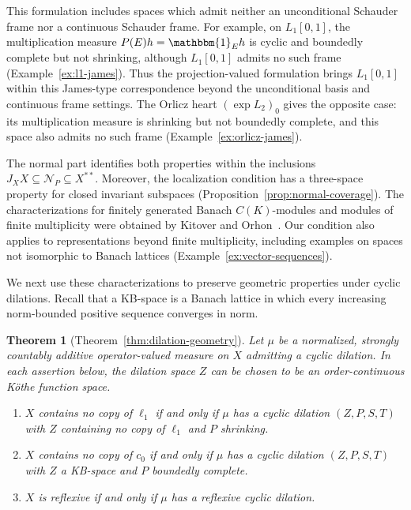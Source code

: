 \documentclass[11pt,leqno]{amsart}
\theoremstyle{compact}
\newtheorem{maintheorem}{Theorem}
\numberwithin{equation}{section}
\theoremstyle{compactremark}
\theoremstyle{compact}
\newcommand{\1}{\mathbbm{1}}
\newcommand{\mnote}[2][0pt]{%
    \marginnote{%
        \parbox[t]{1.8cm}{%
            \raggedright\tiny #2%
        }%
    }[#1]%
}
\begin{document}
This formulation includes spaces which admit neither an unconditional Schauder frame nor a continuous Schauder frame. For example, on $L_1[0,1]$, the multiplication measure $P(E)h=\1_Eh$ is cyclic and boundedly complete but not shrinking, although $L_1[0,1]$ admits no such frame (Example~\ref{ex:l1-james}). Thus the projection-valued formulation brings $L_1[0,1]$ within this James-type correspondence beyond the unconditional basis and continuous frame settings. The Orlicz heart $(\exp L_2)_0$ gives the opposite case: its multiplication measure is shrinking but not boundedly complete, and this space also admits no such frame (Example~\ref{ex:orlicz-james}).

The normal part identifies both properties within the inclusions $J_XX\subseteq\mathcal N_P\subseteq X^{**}$. Moreover, the localization condition has a three-space property for closed invariant subspaces (Proposition~\ref{prop:normal-coverage}). The characterizations for finitely generated Banach $C(K)$-modules and modules of finite multiplicity were obtained by Kitover and Orhon~\cite{KitoverOrhon2014,KitoverOrhon2017}. Our condition also applies to representations beyond finite multiplicity, including examples on spaces not isomorphic to Banach lattices (Example~\ref{ex:vector-sequences}).


We next use these characterizations to preserve geometric properties under cyclic dilations. Recall that a KB-space is a Banach lattice in which every increasing norm-bounded positive sequence converges in norm.

\begin{maintheorem}[Theorem~\ref{thm:dilation-geometry}]\label{intro:dilation}
Let $\mu$ be a normalized, strongly countably additive operator-valued measure on $X$ admitting a cyclic dilation. In each assertion below, the dilation space $Z$ can be chosen to be an order-continuous K\"othe function space.
\begin{enumerate}
\item $X$ contains no copy of $\ell_1$ if and only if $\mu$ has a cyclic dilation $(Z,P,S,T)$ with $Z$ containing no copy of $\ell_1$ and $P$ shrinking.
\item $X$ contains no copy of $c_0$ if and only if $\mu$ has a cyclic dilation $(Z,P,S,T)$ with $Z$ a KB-space and $P$ boundedly complete.
\item $X$ is reflexive if and only if $\mu$ has a reflexive cyclic dilation.
\end{enumerate}
\end{maintheorem}
\end{document}
